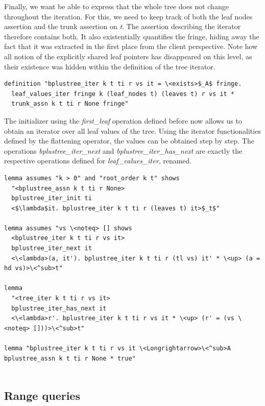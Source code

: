 \documentclass[a4paper,UKenglish,cleveref, cref, thm-restate]{lipics-v2021}
\begin{document}
Finally, we want be able to express that the whole tree does not change throughout the iteration.
For this, we need to keep track of both the leaf nodes assertion and the trunk assertion on \emph{t}.
The assertion describing the iterator therefore contains both.
It also existentially quantifies the fringe, hiding away
the fact that it was extracted in the first place from the client perspective.
Note how all notion of the explicitly shared leaf pointers
has disappeared on this level, as their existence was hidden within the definition
of the tree iterator.


\begin{lstlisting}[mathescape=true, language=Isabelle,label=lst:btree-tree-iter]
definition "bplustree_iter k t ti r vs it = \<exists>$_A$ fringe.
  leaf_values_iter fringe k (leaf_nodes t) (leaves t) r vs it *
  trunk_assn k t ti r None fringe"
\end{lstlisting}

The initializer using the \emph{first\_leaf} operation
defined before now allows us to obtain an iterator over all leaf
values of the tree.
Using the iterator functionalities defined by the flattening operator,
the values can be obtained step by step.
The operations \emph{bplustree\_iter\_next} and \emph{bplustree\_iter\_has\_next}
are exactly the respective operations defined for \emph{leaf\_values\_iter}, renamed.

\begin{lstlisting}
lemma assumes "k > 0" and "root_order k t" shows
  "<bplustree_assn k t ti r None>
  bplustree_iter_init ti
  <$\lambda$it. bplustree_iter k t ti r (leaves t) it>$_t$"

lemma assumes "vs \<noteq> [] shows
  <bplustree_iter k t ti r vs it>
  bplustree_iter_next it
  <\<lambda>(a, it'). bplustree_iter k t ti r (tl vs) it' * \<up> (a = hd vs)>\<^sub>t"

lemma 
  "<tree_iter k t ti r vs it>
  bplustree_iter_has_next it
  <\<lambda>r'. bplustree_iter k t ti r vs it * \<up> (r' = (vs \<noteq> []))>\<^sub>t"

lemma "bplustree_iter k t ti r vs it \<Longrightarrow>\<^sub>A bplustree_assn k t ti r None * true"
  
\end{lstlisting}



\subsection{Range queries}
\label{sec:imperative_range}
\end{document}
